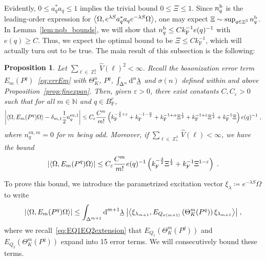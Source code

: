 \documentclass[12pt,a4paper]{article}
\numberwithin{equation}{section}
\newcommand{\NNN}{\mathbb{N}}
\newcommand{\ulambda}{\underline{\lambda}}
\newcommand{\1}{\mathbb{I}}
\renewcommand{\b}{\textnormal{b}}
\newcommand{\di}{\textnormal{d}}
\newcommand{\ex}{\mathrm{ex}}
\newcommand{\F}{\mathrm{F}}
\DeclareMathOperator{\Z}{\mathbb{Z}}
\newcommand{\half}{\frac{1}{2}}
\newcommand{\eva}[1]{\left\langle #1 \right\rangle}
\theoremstyle{plain}
\newtheorem{proposition}[theorem]{Proposition}
\theoremstyle{definition}
\theoremstyle{remark}
\theoremstyle{plain}
\theoremstyle{definition}
\theoremstyle{remark}
\begin{document}
Evidently, $ 0 \le a_q^* a_q \le 1 $ implies the trivial bound $ 0 \le \Xi \le 1 $. \textcolor{green!30!black}{Since $ n_q^{\b} $ is the leading-order expression for $ \expval{\Omega, e^{\lambda S} a^*_q a_q e^{-\lambda S} \Omega} $, one may expect $ \Xi \sim \sup_{q \in \Z^3} n_q^{\b} $. In Lemma~\ref{lem:nqb_bounds}, we will show that $ n_q^{\b} \le  C k_{\F}^{-1} e(q)^{-1} $ with $ e(q) \ge C $. Thus, we expect the optimal bound to be $ \Xi \le C k_{\F}^{-1} $, which will actually turn out to be true.}
The main result of this subsection is the following:

\begin{proposition} \label{prop:finalEmest}
Let $ \sum_{\ell \in \Z^3_*} \hat{V}(\ell)^2 < \infty $. Recall the bosonization error term $E_m(P^q)$~\eqref{eq:errEm} with $ \Theta^n_K $, $ P^q $, $ \int_{\Delta^n} \di^n \ulambda $ and $ \sigma(n) $ defined within and above Proposition~\ref{prop:finexpan}. Then, given $ \varepsilon > 0 $, there exist constants $ C, C_\varepsilon > 0 $ such that for all $ m \in \NNN $ and $ q \in B_{\F}^c $,
\begin{equation} \label{eq:finalEmest_Coulomb}
	\abs{\eva{\Omega, E_m(P^q) \Omega} - \delta_{m,1} \frac 12 n_q^{\ex,1}}
	\leq C_\varepsilon \frac{C^m}{m!} \left( k_{\F}^{-\frac 32 + \varepsilon} 
		+ k_{\F}^{-1 - \frac{\alpha}{2}} 
		+ k_{\F}^{-1+\alpha} \Xi^\half
		+ k_{\F}^{-1+\varepsilon} \Xi^\half
		+ k_{\F}^{-1} \Xi \right) e(q)^{-1} \;,
\end{equation}
where $ n_q^{\ex,m} = 0 $ for $ m $ being odd.
Moreover, if $ \sum_{\ell \in \Z^3_*} \hat{V}(\ell) < \infty $, we have the bound
\begin{equation} \label{eq:finalEmest}
	\abs{\eva{\Omega, E_m(P^q) \Omega}}
	\leq C_\varepsilon \frac{C^m}{m!}
		e(q)^{-1} \left( k_{\F}^{-\frac{3}{2}} \Xi^\half
		+ k_{\F}^{-1}\Xi^{1-\varepsilon} \right) \;.
\end{equation}
\end{proposition}
To prove this bound, we introduce the parametrized excitation vector $ \xi_\lambda \coloneq e^{- \lambda S} \Omega $ to write
\begin{equation} \label{eq:errEm2}
	\abs{\eva{\Omega, E_m(P^q) \Omega }}
	\le \int_{\Delta^{m+1}} \di^{m+1} \underline{\lambda} \;
		\abs{\eva{\xi_{\lambda_{m+1}}, E_{Q_{\sigma(m+1)}}\left(\Theta^{m}_{K}(P^q)\right) \xi_{\lambda_{m+1}}}} \;,
\end{equation}
where we recall~\eqref{eq:EQ1EQ2extension} that $ E_{Q_1}\left(\Theta^m_{K}(P^q)\right) $ and $ E_{Q_2}\left(\Theta^m_{K}(P^q)\right) $ expand into 15 error terms. We will consecutively bound these terms.
\end{document}
